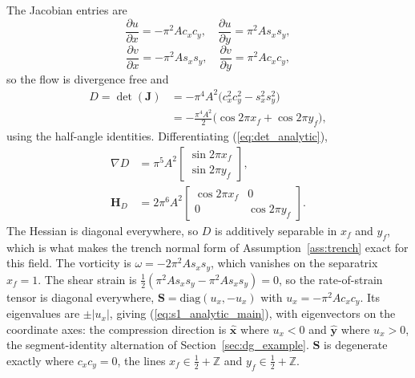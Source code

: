 \documentclass[lettersize,journal]{IEEEtran}
\begin{document}
The Jacobian entries are
\begin{equation}
    \frac{\partial u}{\partial x} = -\pi^2 A c_x c_y, \quad
    \frac{\partial u}{\partial y} =  \pi^2 A s_x s_y,
\end{equation}
\begin{equation}
    \frac{\partial v}{\partial x} = -\pi^2 A s_x s_y, \quad
    \frac{\partial v}{\partial y} =  \pi^2 A c_x c_y,
\end{equation}
so the flow is divergence free and
\begin{equation}
    \begin{split}
    D = \det(\mathbf{J})
      &= -\pi^4 A^2 \bigl(c_x^2 c_y^2 - s_x^2 s_y^2\bigr) \\
      &= -\frac{\pi^4 A^2}{2}\bigl(\cos 2\pi x_f + \cos 2\pi y_f\bigr),
    \end{split}
    \label{eq:det_analytic}
\end{equation}
using the half-angle identities. Differentiating
(\ref{eq:det_analytic}),
\begin{equation}
    \begin{aligned}
    \nabla D &= \pi^5 A^2
    \begin{bmatrix} \sin 2\pi x_f \\ \sin 2\pi y_f \end{bmatrix},
    \\
    \mathbf{H}_D &= 2\pi^6 A^2
    \begin{bmatrix} \cos 2\pi x_f & 0 \\ 0 & \cos 2\pi y_f \end{bmatrix}.
    \end{aligned}
    \label{eq:gradhess_analytic}
\end{equation}
The Hessian is diagonal everywhere, so $D$ is additively separable in
$x_f$ and $y_f$, which is what makes the trench normal form of
Assumption~\ref{ass:trench} exact for this field. The vorticity is
$\omega = -2\pi^2 A s_x s_y$, which vanishes on the separatrix
$x_f = 1$. The shear strain is $\tfrac{1}{2}(\pi^2 A s_x s_y - \pi^2 A
s_x s_y) = 0$, so the rate-of-strain tensor is diagonal everywhere,
$\mathbf{S} = \mathrm{diag}(u_x, -u_x)$ with $u_x = -\pi^2 A c_x c_y$.
Its eigenvalues are $\pm|u_x|$, giving (\ref{eq:s1_analytic_main}),
with eigenvectors on the coordinate axes: the compression direction is
$\hat{\mathbf{x}}$ where $u_x < 0$ and $\hat{\mathbf{y}}$ where $u_x >
0$, the segment-identity alternation of Section~\ref{sec:dg_example}.
$\mathbf{S}$ is degenerate exactly where $c_x c_y = 0$, the lines
$x_f \in \tfrac{1}{2} + \mathbb{Z}$ and $y_f \in \tfrac{1}{2} +
\mathbb{Z}$.
\end{document}
